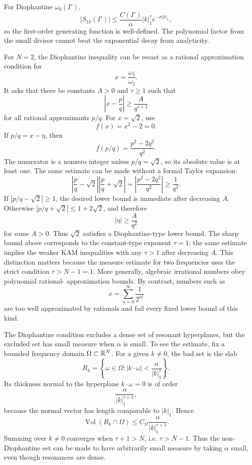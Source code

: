 For Diophantine \(\omega_0(I')\),
\[
  |S_{1k}(I')|
  \leq
  \frac{C(I')}{\alpha}|k|_1^\tau e^{-\sigma |k|_1},
\]
so the first-order generating function is well-defined. The polynomial factor
from the small divisor cannot beat the exponential decay from analyticity.

\begin{example}
For \(N=2\), the Diophantine inequality can be recast as a rational
approximation condition for
\[
  x=\frac{\omega_1}{\omega_2}.
\]
It asks that there be constants \(A>0\) and \(\tau\ge 1\) such that
\[
  \left|x-\frac{p}{q}\right|
  \geq
  \frac{A}{q^{\tau+1}}
\]
for all rational approximants \(p/q\). For \(x=\sqrt2\), use
\[
  f(x)=x^2-2=0.
\]
If \(p/q=x-\eta\), then
\[
  f(p/q)=\frac{p^2-2q^2}{q^2}.
\]
The numerator is a nonzero integer unless \(p/q=\sqrt2\), so its absolute value
is at least one. The same estimate can be made without a formal Taylor
expansion:
\[
  \left|\frac pq-\sqrt2\right|
  \left|\frac pq+\sqrt2\right|
  =
  \left|\frac{p^2-2q^2}{q^2}\right|
  \ge \frac1{q^2}.
\]
If \(|p/q-\sqrt2|\ge1\), the desired lower bound is immediate after decreasing
\(A\). Otherwise \(|p/q+\sqrt2|\le 1+2\sqrt2\), and therefore
\[
  |\eta|\geq \frac{A}{q^2}
\]
for some \(A>0\). Thus \(\sqrt2\) satisfies a Diophantine-type lower bound.
The sharp bound above corresponds to the constant-type exponent \(\tau=1\);
the same estimate implies the weaker KAM inequalities with any \(\tau>1\) after
decreasing \(A\). This distinction matters because the measure estimate for
two frequencies uses the strict condition \(\tau>N-1=1\).
More generally, algebraic irrational numbers obey polynomial rational-
approximation bounds. By contrast, numbers such as
\[
  x=\sum_{n=0}^{\infty}\frac{1}{2^{n!}}
\]
are too well approximated by rationals and fail every fixed lower bound of this
kind.
\end{example}

The Diophantine condition excludes a dense set of resonant hyperplanes, but the
excluded set has small measure when \(\alpha\) is small. To see the estimate,
fix a bounded frequency domain \(\Omega\subset\mathbb{R}^N\). For a given
\(k\neq0\), the bad set is the slab
\[
  R_k
  =
  \left\{
    \omega\in\Omega:
    |k\cdot\omega|<
    \frac{\alpha}{|k|_1^\tau}
  \right\}.
\]
Its thickness normal to the hyperplane \(k\cdot\omega=0\) is of order
\[
  \frac{\alpha}{|k|_1^{\tau+1}},
\]
because the normal vector has length comparable to \(|k|_1\). Hence
\[
  \operatorname{Vol}(R_k\cap\Omega)
  \leq
  C_\Omega\frac{\alpha}{|k|_1^{\tau+1}}.
\]
Summing over \(k\neq0\) converges when \(\tau+1>N\), i.e. \(\tau>N-1\). Thus
the non-Diophantine set can be made to have arbitrarily small measure by taking
\(\alpha\) small, even though resonances are dense.

